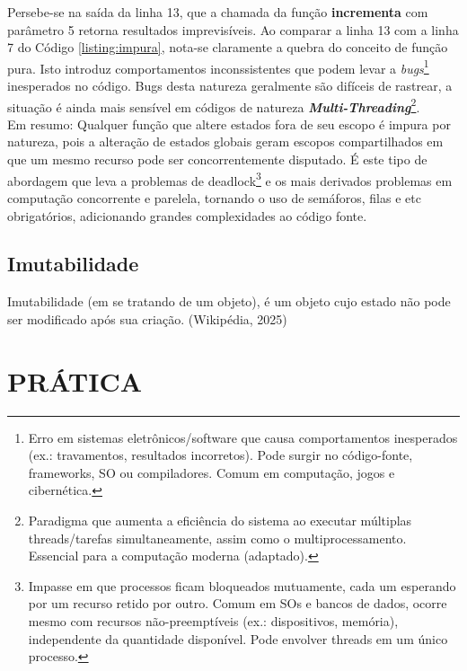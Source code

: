 \documentclass[date,twocolumn,a4paper]{ppgem}
\begin{document}
        Persebe-se na saída da linha 13, que a chamada da função \textbf{incrementa} com parâmetro 5 retorna resultados imprevisíveis. Ao comparar
        a linha 13 com a linha 7 do Código \ref{listing:impura}, nota-se claramente a quebra do conceito de função pura. Isto introduz comportamentos inconssistentes
        que podem levar a \textit{bugs}\footnote{
            Erro em sistemas eletrônicos/software que causa comportamentos inesperados (ex.: travamentos, resultados incorretos). Pode surgir no código-fonte, frameworks, SO ou compiladores. Comum em computação, jogos e cibernética\cite{wiki_bug}.
        } inesperados no código. Bugs desta natureza geralmente são difíceis de rastrear, a situação é ainda
        mais sensível em códigos de natureza \textit{\textbf{Multi-Threading}}\footnote{
            Paradigma que aumenta a eficiência do sistema ao executar múltiplas threads/tarefas simultaneamente, assim como o multiprocessamento. Essencial para a computação moderna\cite{wiki_multithreading} (adaptado).
        }.\\
        Em resumo: Qualquer função que altere estados fora de seu escopo é impura por natureza, pois a alteração de estados globais geram escopos compartilhados em que um mesmo recurso pode ser concorrentemente disputado.
        É este tipo de abordagem que leva a problemas de deadlock\footnote{
            Impasse em que processos ficam bloqueados mutuamente, cada um esperando por um recurso retido por outro. Comum em SOs e bancos de dados, ocorre mesmo com recursos não-preemptíveis (ex.: dispositivos, memória), independente da quantidade disponível. Pode envolver threads em um único processo\cite{wiki_deadlock}.
        } e os mais derivados problemas em computação concorrente e parelela, tornando o uso de semáforos, filas e etc obrigatórios, adicionando grandes complexidades ao código fonte.

    \subsection{Imutabilidade}
        Imutabilidade (em se tratando de um objeto), é um objeto cujo estado não pode ser modificado após sua criação. (Wikipédia, 2025)\cite{wiki_immutable}
    
    
    \section{PRÁTICA}
\end{document}
